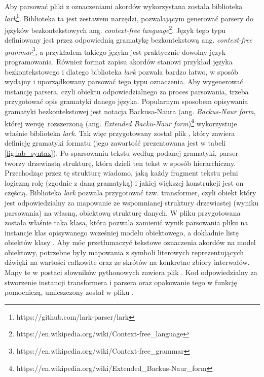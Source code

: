 Aby parsować pliki z oznaczeniami akordów wykorzystana została biblioteka
\emph{lark}\footnote{https://github.com/lark-parser/lark}. Biblioteka ta jest zestawem narzędzi,
pozwalającym generować parsery do języków bezkontekstowych ang. \emph{context-free
language}\footnote{https://en.wikipedia.org/wiki/Context-free\_language}. Język tego typu definiowany
jest przez odpowiednią gramatykę bezkontekstową ang. \emph{context-free
grammar}\footnote{https://en.wikipedia.org/wiki/Context-free\_grammar}, a przykładem takiego języka
jest praktycznie dowolny język programowania. Również format zapisu akordów stanowi przykład języka
bezkontekstowego i dlatego biblioteka \emph{lark} pozwala bardzo łatwo, w sposób wydajny i
uporządkowany parsować tego typu oznaczenia. Aby wygenerować instancję parsera, czyli obiektu
odpowiedzialnego za proces parsowania, trzeba przygotować opis gramatyki danego języka. Popularnym
sposobem opisywania gramatyki bezkontekstowej jest notacja Backusa-Naura (ang. \emph{Backus-Naur
form}, której wersję rozszerzoną (ang. \emph{Extended Backu-Naur
form})\footnote{https://en.wikipedia.org/wiki/Extended\_Backus-Naur\_form} wykorzystuje właśnie
biblioteka \emph{lark}. Tak więc przygotowany został plik
, który zawiera definicję gramatyki formatu
 (jego zawartość prezentowana jest w tabeli \ref{fig:lab_syntax}). Po sparsowaniu tekstu
według podanej gramatyki, parser tworzy drzewiastą strukturę, która dzieli ten tekst w sposób
hierarchiczny. Przechodząc przez tę strukturę wiadomo, jaką każdy fragment tekstu pełni logiczną
rolę (zgodnie z daną gramatyką) i jakiej większej konstrukcji jest on częścią. Biblioteka
\emph{lark} pozwala przygotować tzw. transformer, czyli obiekt który jest odpowiedzialny za
mapowanie ze wspomnianej struktury drzewiastej (wyniku parsowania) na własną, obiektową strukturę
danych. W pliku  przygotowana została właśnie taka
klasa, która pozwala zamienić wynik parsowania pliku  na instancje klas opisywanego
wcześniej modelu obiektowego, a dokładnie listę obiektów klasy . Aby móc
przetłumaczyć tekstowe oznaczenia akordów na model obiektowy, potrzebne były mapowania z symboli
literowych reprezentujących dźwięki na wartości całkowite oraz ze skrótów na konkretne zbiory
interwałów. Mapy te w postaci słowników pythonowych zawiera plik
. Kod odpowiedzialny za stworzenie instancji
transformera i parsera oraz opakowanie tego w funkcję pomocniczą, umieszczony został w pliku
. 

